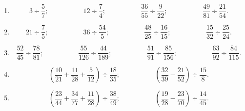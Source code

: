\documentclass[12 pt]{report}
\theoremstyle{plain}
\newcounter{n}
\begin{document}
 \begin{enumerate}
 \item \[ 3 \div \frac57;\phantom{meowmeow}
 12\div \frac74 ; \phantom{meowmeow}
 \frac{36}{55}\div\frac{9}{22}; \phantom{meowmeow}
 \frac{49}{81}\div \frac{21}{54}.\]
 
  \item \[ 21 \div \frac75;\phantom{meowmeow}
 36\div \frac{54}5 ; \phantom{meowmeow}
 \frac{48}{25}\div\frac{16}{15}; \phantom{meowmeow}
 \frac{15}{32}\div \frac{25}{24}.\]
 
  \item \[ \frac{52}{45} \div \frac{78}{81};\phantom{meowmeow}
 \frac{55}{126}\div\frac{44}{189} ; \phantom{meowmeow}
 \frac{51}{91}\div\frac{85}{156}; \phantom{meowmeow}
 \frac{63}{92}\div \frac{84}{115}.\]
 
 \item \[ \left( \frac{10}{21} +\frac{11}{28} + \frac5{12} \right) \div \frac{18}{35} ;
 \phantom{meowmeow}
 \left( \frac{32}{39} - \frac{21}{52} \right) \div \frac{15}{8}. \]
 
 \item \[ \left( \frac{23}{44} +\frac{34}{77} + \frac{11}{28} \right) \div \frac{38}{49};
 \phantom{meowmeow}
 \left( \frac{19}{28} - \frac{23}{70} \right) \div \frac{14}{45}. \]
 

\end{enumerate}
\end{document}
